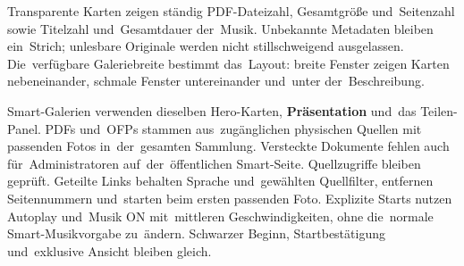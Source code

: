 \documentclass[11pt,a4paper]{article}
\newcommand{\ui}[1]{\textbf{#1}}
\begin{document}
Transparente Karten zeigen ständig PDF-Dateizahl, Gesamtgröße und~Seitenzahl
sowie Titelzahl und~Gesamtdauer der~Musik. Unbekannte Metadaten bleiben
ein~Strich; unlesbare Originale werden nicht stillschweigend ausgelassen.
Die~verfügbare Galeriebreite bestimmt das~Layout: breite Fenster zeigen
Karten nebeneinander, schmale Fenster untereinander und~unter der~Beschreibung.

Smart-Galerien verwenden dieselben Hero-Karten, \ui{Präsentation} und~das
Teilen-Panel. PDFs und~OFPs stammen aus~zugänglichen physischen Quellen mit
passenden Fotos in~der~gesamten Sammlung. Versteckte Dokumente fehlen auch
für~Administratoren auf~der~öffentlichen Smart-Seite. Quellzugriffe bleiben
geprüft.
Geteilte Links behalten Sprache und~gewählten Quellfilter, entfernen
Seitennummern
und~starten beim ersten passenden Foto. Explizite Starts nutzen Autoplay
und~Musik
ON mit~mittleren Geschwindigkeiten, ohne die~normale Smart-Musikvorgabe
zu~ändern.
Schwarzer Beginn, Startbestätigung und~exklusive Ansicht bleiben gleich.
\end{document}
